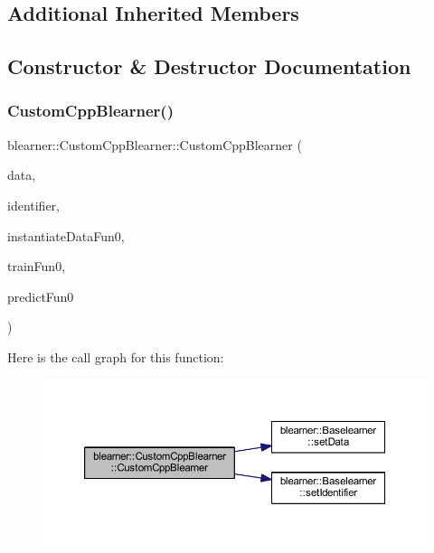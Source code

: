 \subsection*{Additional Inherited Members}


\subsection{Constructor \& Destructor Documentation}
\mbox{\label{classblearner_1_1_custom_cpp_blearner_a053eccfff8223ab0358b7f00ed02d263}} 
\subsubsection{\texorpdfstring{Custom\+Cpp\+Blearner()}{CustomCppBlearner()}}
{\footnotesize\ttfamily blearner\+::\+Custom\+Cpp\+Blearner\+::\+Custom\+Cpp\+Blearner (\begin{DoxyParamCaption}\item[{\hyperlink{classdata_1_1_data}{data\+::\+Data} $\ast$}]{data,  }\item[{const std\+::string \&}]{identifier,  }\item[{S\+E\+XP}]{instantiate\+Data\+Fun0,  }\item[{S\+E\+XP}]{train\+Fun0,  }\item[{S\+E\+XP}]{predict\+Fun0 }\end{DoxyParamCaption})}

Here is the call graph for this function\+:\nopagebreak
\begin{figure}[H]
\begin{center}
\leavevmode
\includegraphics[width=350pt]{classblearner_1_1_custom_cpp_blearner_a053eccfff8223ab0358b7f00ed02d263_cgraph}
\end{center}
\end{figure}
\mbox{\label{classblearner_1_1_custom_cpp_blearner_a4e26b5c9da2eaff19a21de8fdb534bc5}} 
